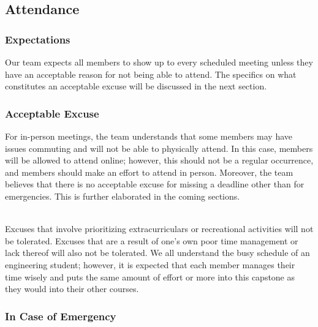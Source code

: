 \documentclass{article}
\begin{document}
\subsection*{Attendance}

\subsubsection*{Expectations}


Our team expects all members to show up to every scheduled meeting unless they have an acceptable reason for not being able to attend. The specifics on what constitutes an acceptable excuse will be discussed in the next section.

\subsubsection*{Acceptable Excuse}


For in-person meetings, the team understands that some members may have issues commuting and will not be able to physically attend. In this case, members will be allowed to attend online; however, this should not be a regular occurrence, and members should make an effort to attend in person. Moreover, the team believes that there is no acceptable excuse for missing a deadline other than for emergencies. This is further elaborated in the coming sections. 

\\Excuses that involve prioritizing extracurriculars or recreational activities will not be tolerated.
Excuses that are a result of one's own poor time management or lack thereof will also not be tolerated.
We all understand the busy schedule of an engineering student; however, it is expected that each member manages their time wisely and puts the same amount of effort or more into this capstone as they would into their other courses.



\subsubsection*{In Case of Emergency}
\end{document}
